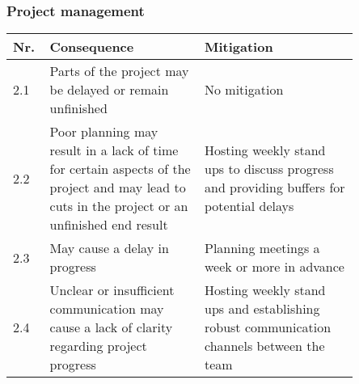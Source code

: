 \documentclass{article} %
\begin{document}
\subsubsection{Project management}

\begin{center}
    \begin{tabular}{| p{0.05\linewidth} | p{0.4\linewidth} | p{0.4\linewidth} |}
        \hline
        Nr. & Consequence                                                                                                                                   & Mitigation                                                                               \\ [0.5ex]
        \hline\hline
        2.1 & Parts of the project may be delayed or remain unfinished                                                                                      & No mitigation                                                                            \\
        \hline
        2.2 & Poor planning may result in a lack of time for certain aspects of the project and may lead to cuts in the project or an unfinished end result & Hosting weekly stand ups to discuss progress and providing buffers for potential delays  \\
        \hline
        2.3 & May cause a delay in progress                                                                                                                 & Planning meetings a week or more in advance                                              \\
        \hline
        2.4 & Unclear or insufficient communication may cause a lack of clarity regarding project progress                                                  & Hosting weekly stand ups and establishing robust communication channels between the team \\
        \hline
    \end{tabular}
\end{center}

\newpage
\end{document}
